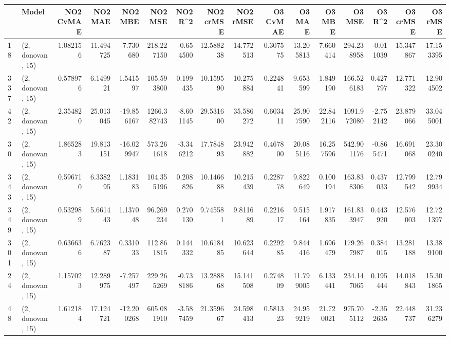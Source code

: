 \begin{tabular}{llrrrrrrrrrrrrrr}
\toprule
{} &             Model &  NO2 CvMAE &    NO2 MAE &    NO2 MBE &      NO2 MSE &    NO2 R\textasciicircum2 &  NO2 crMSE &   NO2 rMSE &  O3 CvMAE &     O3 MAE &     O3 MBE &       O3 MSE &    O3 R\textasciicircum2 &   O3 crMSE &    O3 rMSE \\
\midrule
18  &  (2, donovan, 15) &   1.082156 &  11.494725 &  -7.730680 &   218.227150 &  -0.654500 &  12.588238 &  14.772513 &  0.307575 &  13.205813 &   7.660414 &   294.238958 & -0.011039 &  15.347867 &  17.153395 \\
337 &  (2, donovan, 15) &   0.578976 &   6.149921 &   1.541597 &   105.593800 &   0.199435 &  10.159590 &  10.275884 &  0.224841 &   9.653599 &   1.849190 &   166.526183 &  0.427797 &  12.771322 &  12.904502 \\
42  &  (2, donovan, 15) &   2.354820 &  25.013045 & -19.856167 &  1266.382743 &  -8.601145 &  29.531600 &  35.586272 &  0.603411 &  25.907590 &  22.842116 &  1091.972080 & -2.752142 &  23.879066 &  33.045001 \\
30  &  (2, donovan, 15) &   1.865283 &  19.813151 & -16.029947 &   573.261618 &  -3.346212 &  17.784893 &  23.942882 &  0.467800 &  20.085116 &  16.257596 &   542.901176 & -0.865471 &  16.691068 &  23.300240 \\
343 &  (2, donovan, 15) &   0.596710 &   6.338295 &   1.183183 &   104.355196 &   0.208826 &  10.146688 &  10.215439 &  0.228778 &   9.822649 &   0.100194 &   163.838306 &  0.437033 &  12.799542 &  12.799934 \\
349 &  (2, donovan, 15) &   0.532989 &   5.661443 &   1.137048 &    96.269234 &   0.270130 &   9.745581 &   9.811689 &  0.221617 &   9.515164 &   1.917835 &   161.833947 &  0.443920 &  12.576003 &  12.721397 \\
301 &  (2, donovan, 15) &   0.636636 &   6.762387 &   0.331033 &   112.861815 &   0.144332 &  10.618485 &  10.623644 &  0.229285 &   9.844416 &   1.696479 &   179.267987 &  0.384015 &  13.281188 &  13.389100 \\
24  &  (2, donovan, 15) &   1.157023 &  12.289975 &  -7.257497 &   229.265269 &  -0.738186 &  13.288868 &  15.141508 &  0.274809 &  11.799005 &   6.133441 &   234.147065 &  0.195444 &  14.018843 &  15.301865 \\
48  &  (2, donovan, 15) &   1.612184 &  17.124721 & -12.200268 &   605.081910 &  -3.587459 &  21.359667 &  24.598413 &  0.581323 &  24.959219 &  21.720021 &   975.705112 & -2.352635 &  22.448737 &  31.236279 \\

\end{tabular}
